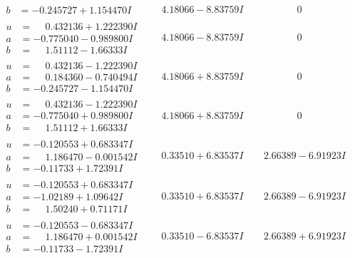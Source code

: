 \documentclass[1p]{elsarticle_modified}
\theoremstyle{definition}
\begin{document}
$$\begin{array}{c|c|c}
\begin{aligned}
b &= -0.245727 + 1.154470 I\end{aligned}
 & \phantom{-}4.18066 - 8.83759 I & \phantom{-0.000000 } 0 \\ \hline\begin{aligned}
u &= \phantom{-}0.432136 + 1.222390 I \\
a &= -0.775040 - 0.989800 I \\
b &= \phantom{-}1.51112 - 1.66333 I\end{aligned}
 & \phantom{-}4.18066 - 8.83759 I & \phantom{-0.000000 } 0 \\ \hline\begin{aligned}
u &= \phantom{-}0.432136 - 1.222390 I \\
a &= \phantom{-}0.184360 - 0.740494 I \\
b &= -0.245727 - 1.154470 I\end{aligned}
 & \phantom{-}4.18066 + 8.83759 I & \phantom{-0.000000 } 0 \\ \hline\begin{aligned}
u &= \phantom{-}0.432136 - 1.222390 I \\
a &= -0.775040 + 0.989800 I \\
b &= \phantom{-}1.51112 + 1.66333 I\end{aligned}
 & \phantom{-}4.18066 + 8.83759 I & \phantom{-0.000000 } 0 \\ \hline\begin{aligned}
u &= -0.120553 + 0.683347 I \\
a &= \phantom{-}1.186470 - 0.001542 I \\
b &= -0.11733 + 1.72391 I\end{aligned}
 & \phantom{-}0.33510 + 6.83537 I & \phantom{-}2.66389 - 6.91923 I \\ \hline\begin{aligned}
u &= -0.120553 + 0.683347 I \\
a &= -1.02189 + 1.09642 I \\
b &= \phantom{-}1.50240 + 0.71171 I\end{aligned}
 & \phantom{-}0.33510 + 6.83537 I & \phantom{-}2.66389 - 6.91923 I \\ \hline\begin{aligned}
u &= -0.120553 - 0.683347 I \\
a &= \phantom{-}1.186470 + 0.001542 I \\
b &= -0.11733 - 1.72391 I\end{aligned}
 & \phantom{-}0.33510 - 6.83537 I & \phantom{-}2.66389 + 6.91923 I \\ \hline\begin{aligned}

\end{aligned}
\end{array}$$
\end{document}
